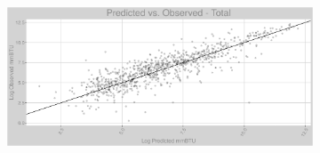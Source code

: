 \FloatBarrier
\newpage
\begin{figure}
\begin{subfigure}{1\textwidth}
\centering
\includegraphics[width=.99\textwidth, height=0.6\textheight, angle=90, origin=c]{Images/natural_gas_psf_nn_full_pvo_transformed.png}
\end{subfigure}
\end{figure}
\FloatBarrier
\newpage
